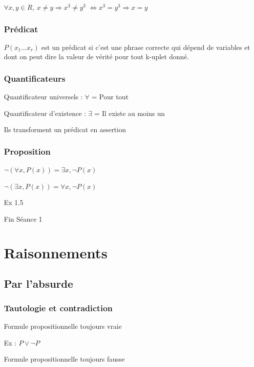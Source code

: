 \documentclass[french]{yLectureNote}
\begin{document}
$\forall x,y \in R,\: x\neq y \Rightarrow x^3\neq y^3$ $\iff x^3=y^3 \Rightarrow x=y$

\subsubsection{Prédicat}
$P(x_1\dots x_r)$ est un prédicat si c'est une phrase correcte qui dépend de variables et dont on peut dire la valeur de vérité pour tout k-uplet donné.

\subsubsection{Quantificateurs}
Quantificateur universels : $\forall$ = Pour tout

Quantificateur d'existence : $\exists$ = Il existe au moins un

Ils transforment un prédicat en assertion

\subsubsection{Proposition}
$\neg (\forall x, P(x)) = \exists x, \neg P(x)$

$\neg(\exists x, P(x)) = \forall x, \neg P(x)$

Ex 1.5

\begin{center}
Fin Séance 1
\end{center}

\yOrnament
\section{Raisonnements}
\subsection{Par l'absurde}
\subsubsection{Tautologie et contradiction}

\begin{theorem}[Tautologie]
Formule propositionnelle toujours vraie
\end{theorem}

Ex : $P \vee \neg P$

\begin{theorem}[Contradiction]
Formule propositionnelle toujours fausse
\end{theorem}
\end{document}
